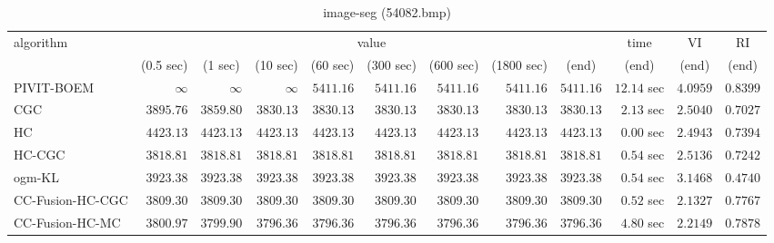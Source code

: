\begin{table}[H]
\scriptsize
\centering
\caption{image-seg (54082.bmp)}
\label{tab:anytimetable-image-seg-54082.bmp}
\begin{tabular}{lrrrrrrrrrrr}
\toprule
           algorithm &                                   \multicolumn{8}{c}{value} & \multicolumn{1}{c}{time}    & \multicolumn{1}{c}{VI}  & \multicolumn{1}{c}{RI} \\  
\cmidrule(lr){2-9}\cmidrule(lr){10-10} \cmidrule(lr){11-11} \cmidrule(lr){12-12}   
                     & \multicolumn{1}{c}{(0.5 sec)} & \multicolumn{1}{c}{(1 sec)} & \multicolumn{1}{c}{(10 sec)} & \multicolumn{1}{c}{(60 sec)} & \multicolumn{1}{c}{(300 sec)} & \multicolumn{1}{c}{(600 sec)} & \multicolumn{1}{c}{(1800 sec)} & \multicolumn{1}{c}{(end)} & \multicolumn{1}{c}{(end)}    & \multicolumn{1}{c}{(end)}   & \multicolumn{1}{c}{(end)}  \\ \midrule 
          PIVIT-BOEM & $\infty$ & $\infty$ & $\infty$ & $      5411.16$ & $      5411.16$ & $      5411.16$ & $      5411.16$ & $      5411.16$ & $        12.14$ sec    & $       4.0959$  & $       0.8399$ \\ 
                 CGC & $      3895.76$ & $      3859.80$ & $      3830.13$ & $      3830.13$ & $      3830.13$ & $      3830.13$ & $      3830.13$ & $      3830.13$ & $         2.13$ sec    & $       2.5040$  & $       0.7027$ \\ 
                  HC & $      4423.13$ & $      4423.13$ & $      4423.13$ & $      4423.13$ & $      4423.13$ & $      4423.13$ & $      4423.13$ & $      4423.13$ & $         0.00$ sec    & $       2.4943$  & $       0.7394$ \\ 
              HC-CGC & $      3818.81$ & $      3818.81$ & $      3818.81$ & $      3818.81$ & $      3818.81$ & $      3818.81$ & $      3818.81$ & $      3818.81$ & $         0.54$ sec    & $       2.5136$  & $       0.7242$ \\ 
              ogm-KL & $      3923.38$ & $      3923.38$ & $      3923.38$ & $      3923.38$ & $      3923.38$ & $      3923.38$ & $      3923.38$ & $      3923.38$ & $         0.54$ sec    & $       3.1468$  & $       0.4740$ \\ 
    CC-Fusion-HC-CGC & $      3809.30$ & $      3809.30$ & $      3809.30$ & $      3809.30$ & $      3809.30$ & $      3809.30$ & $      3809.30$ & $      3809.30$ & $         0.52$ sec    & $       2.1327$  & $       0.7767$ \\ 
     CC-Fusion-HC-MC & $      3800.97$ & $      3799.90$ & $      3796.36$ & $      3796.36$ & $      3796.36$ & $      3796.36$ & $      3796.36$ & $      3796.36$ & $         4.80$ sec    & $       2.2149$  & $       0.7878$ \\ 

\end{tabular}
\end{table}
